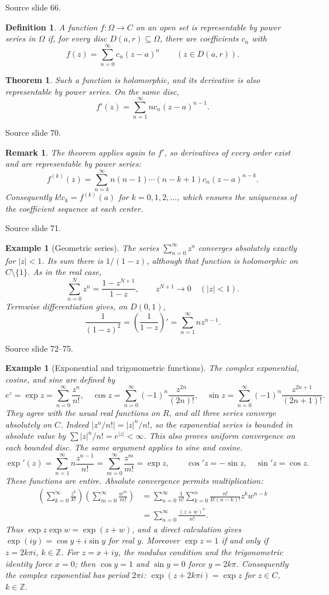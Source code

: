 \documentclass[10pt,letterpaper,twoside,openright]{amsbook}
\numberwithin{equation}{subsection}
\theoremstyle{sea-plain}
\newtheorem{theorem}[subsection]{Theorem}
\theoremstyle{sea-definition}
\newtheorem{definition}[subsection]{Definition}
\newtheorem{example}[subsection]{Example}
\newtheorem{remark}[subsection]{Remark}
\theoremstyle{sea-exercise}
\newcommand{\ZZ}{\mathbb{Z}}
\newcommand{\RR}{\mathbb{R}}
\newcommand{\CC}{\mathbb{C}}
\newcommand{\DD}{\mathbb{D}}
\newcommand{\HH}{\mathbb{H}}
\newcommand{\Chat}{\mathbb{C}_{\infty}}
\def\CC{C}\def\RR{R}\def\DD{D}\def\HH{H}\def\Chat{C infinity}}
\newcommand{\src}[1]{\par\smallskip\noindent
 {\scriptsize\sffamily\color{SoftWhite}Source slide #1.}\par\nopagebreak\smallskip}
\begin{document}
\src{66}
\begin{definition}
A function $f:\Omega\to\CC$ on an open set is representable by power
series in $\Omega$ if, for every disc $D(a,r)\subseteq\Omega$, there are
coefficients $c_n$ with
\[
 f(z)=\sum_{n=0}^\infty c_n(z-a)^n\qquad(z\in D(a,r)).
\]
\end{definition}
\begin{theorem}
Such a function is holomorphic, and its derivative is also representable
by power series. On the same disc,
\[
 f'(z)=\sum_{n=1}^\infty nc_n(z-a)^{n-1}.
\]
\end{theorem}
\src{70}
\begin{remark}
The theorem applies again to $f'$, so derivatives of every order exist and
are representable by power series:
\[
 f^{(k)}(z)=\sum_{n=k}^\infty
 n(n-1)\cdots(n-k+1)c_n(z-a)^{n-k}.
\]
Consequently $k!c_k=f^{(k)}(a)$ for $k=0,1,2,\ldots$, which ensures the
uniqueness of the coefficient sequence at each center.
\end{remark}
\src{71}
\begin{example}[Geometric series]
The series $\sum_{n=0}^\infty z^n$ converges absolutely exactly for $|z|<1$.
Its sum there is $1/(1-z)$, although that function is holomorphic on
$\CC\setminus\{1\}$. As in the real case,
\[
 \sum_{n=0}^Nz^n=\frac{1-z^{N+1}}{1-z},\qquad z^{N+1}\to0\quad(|z|<1).
\]
Termwise differentiation gives, on $D(0,1)$,
\[
 \frac1{(1-z)^2}=\left(\frac1{1-z}\right)'
 =\sum_{n=1}^\infty nz^{n-1}.
\]
\end{example}
\src{72--75}
\begin{example}[Exponential and trigonometric functions]
The complex exponential, cosine, and sine are defined by
\[
 e^z=\exp z=\sum_{n=0}^\infty\frac{z^n}{n!},\quad
 \cos z=\sum_{n=0}^\infty(-1)^n\frac{z^{2n}}{(2n)!},\quad
 \sin z=\sum_{n=0}^\infty(-1)^n\frac{z^{2n+1}}{(2n+1)!}.
\]
They agree with the usual real functions on $\RR$, and all three series
converge absolutely on $\CC$. Indeed $|z^n/n!|=|z|^n/n!$, so the
exponential series is bounded in absolute value by
$\sum|z|^n/n!=e^{|z|}<\infty$. This also proves uniform convergence on
each bounded disc. The same argument applies to sine and cosine.
\[
 \exp'(z)=\sum_{n=1}^\infty n\frac{z^{n-1}}{n!}
 =\sum_{m=0}^\infty\frac{z^m}{m!}=\exp z,\qquad
 \cos' z=-\sin z,\quad \sin' z=\cos z.
\]
These functions are entire. Absolute convergence permits multiplication:
\[
\begin{aligned}
\left(\sum_{k=0}^\infty\frac{z^k}{k!}\right)
\left(\sum_{m=0}^\infty\frac{w^m}{m!}\right)
 &=\sum_{n=0}^\infty\frac1{n!}
   \sum_{k=0}^n\frac{n!}{k!(n-k)!}z^kw^{n-k}\\
 &=\sum_{n=0}^\infty\frac{(z+w)^n}{n!}.
\end{aligned}
\]
Thus $\exp z\exp w=\exp(z+w)$, and a direct calculation gives
$\exp(iy)=\cos y+i\sin y$ for real $y$.
Moreover $\exp z=1$ if and only if $z=2k\pi i$, $k\in\ZZ$.
For $z=x+iy$, the modulus condition and the trigonometric identity force
$x=0$; then $\cos y=1$ and $\sin y=0$ force $y=2k\pi$.
Consequently the complex exponential has period $2\pi i$:
$\exp(z+2k\pi i)=\exp z$ for $z\in\CC$, $k\in\ZZ$.
\end{example}
\end{document}
